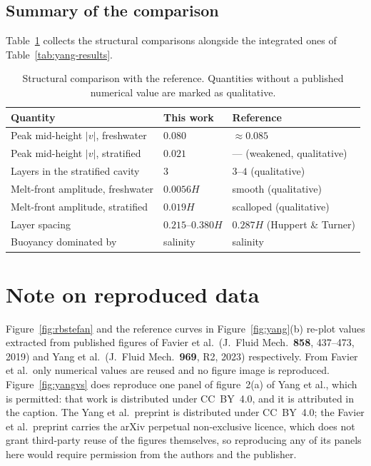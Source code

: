 \documentclass[review,12pt]{elsarticle}
\begin{document}
\subsection{Summary of the comparison}

Table~\ref{tab:yang-qual} collects the structural comparisons alongside the
integrated ones of Table~\ref{tab:yang-results}.

\begin{table}[H]
\centering
\caption{Structural comparison with the reference. Quantities without a
published numerical value are marked as qualitative.}
\label{tab:yang-qual}
\begin{tabular}{l l l}
\toprule
Quantity & This work & Reference \\
\midrule
Peak mid-height $|v|$, freshwater & $0.080$ & $\approx0.085$ \\
Peak mid-height $|v|$, stratified & $0.021$ & --- (weakened, qualitative) \\
Layers in the stratified cavity & $3$ & $3$--$4$ (qualitative) \\
Melt-front amplitude, freshwater & $0.0056H$ & smooth (qualitative) \\
Melt-front amplitude, stratified & $0.019H$ & scalloped (qualitative) \\
Layer spacing & $0.215$--$0.380H$ & $0.287H$ (Huppert \& Turner) \\
Buoyancy dominated by & salinity & salinity \\
\bottomrule
\end{tabular}
\end{table}

\section*{Note on reproduced data}

Figure~\ref{fig:rbstefan} and the reference curves in
Figure~\ref{fig:yang}(b) re-plot values extracted from published figures of
Favier et al.\ (J.~Fluid Mech.\ \textbf{858}, 437--473, 2019) and Yang et al.\
(J.~Fluid Mech.\ \textbf{969}, R2, 2023) respectively. From Favier et al.\ only numerical values are reused and no figure image is
reproduced. Figure~\ref{fig:yangvs} does reproduce one panel of figure~2(a) of
Yang et al., which is permitted: that work is distributed under CC~BY~4.0, and
it is attributed in the caption. The Yang et al.\
preprint is distributed under CC~BY~4.0; the Favier et al.\ preprint carries the
arXiv perpetual non-exclusive licence, which does not grant third-party reuse of
the figures themselves, so reproducing any of its panels here would require
permission from the authors and the publisher.
\end{document}
